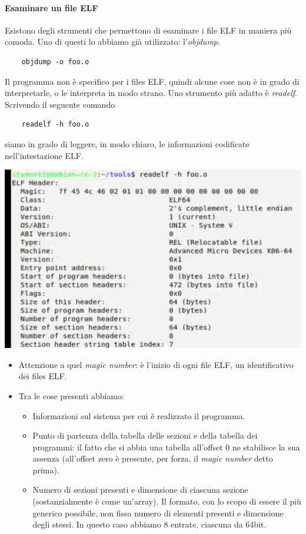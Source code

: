 \paragraph{Esaminare un file ELF} Esistono degli strumenti che permettono di esaminare i file ELF in maniera più comoda. Uno di questi lo abbiamo già utilizzato: l'\emph{objdump}.
\begin{verbatim}
	objdump -o foo.o
\end{verbatim}
Il programma non è specifico per i files ELF, quindi alcune cose non è in grado di interpretarle, o le interpreta in modo strano. Uno strumento più adatto è \emph{readelf}. Scrivendo il seguente comando
\begin{verbatim}
	readelf -h foo.o
\end{verbatim}
siamo in grado di leggere, in modo chiaro, le informazioni codificate nell'intestazione ELF.\begin{center}
	\includegraphics{img/53.PNG}
\end{center}  
\begin{itemize}
	\item Attenzione a quel \emph{magic number}: è l'inizio di ogni file ELF, un identificativo dei files ELF. 
	\item Tra le cose presenti abbiamo:
	\begin{itemize}
		\item Informazioni sul sistema per cui è realizzato il programma.
		\item Punto di partenza della tabella delle sezioni e della tabella dei programmi: il fatto che si abbia una tabella all'offset 0 ne stabilisce la sua assenza (all'offset zero è presente, per forza, il \emph{magic number} detto prima).
		\item Numero di sezioni presenti e dimensione di ciascuna sezione (sostanzialmente è come un'array). Il formato, con lo scopo di essere il più generico possibile, non fissa numero di elementi presenti e dimensione degli stessi. In questo caso abbiamo 8 entrate, ciascuna da 64bit.
	\end{itemize}
\end{itemize}
